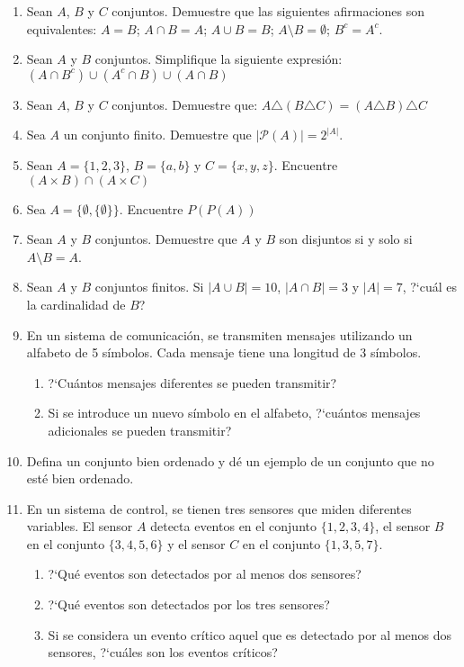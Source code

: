 \begin{enumerate}
	
	\item Sean $A$, $B$ y $C$ conjuntos. Demuestre que las siguientes afirmaciones son equivalentes: $A = B$; $A \cap B = A$; $A \cup B = B$; $A \setminus B = \emptyset$; $B^c = A^c$.
	
	\item Sean $A$ y $B$ conjuntos. Simplifique la siguiente expresión:
	\( (A \cap B^c) \cup (A^c \cap B) \cup (A \cap B) \)
	\item Sean $A$, $B$ y $C$ conjuntos. Demuestre que: \( A \triangle (B \triangle C) = (A \triangle B) \triangle C \)
	
	\item Sea $A$ un conjunto finito. Demuestre que $|\mathcal{P}(A)| = 2^{|A|}$.
	
	\item Sean $A=\{1,2,3\}$, $B=\{a,b\}$ y $C=\{x,y,z\}$. Encuentre $(A \times B) \cap (A \times C)$
	
	\item Sea $A=\{\emptyset, \{\emptyset\}\}$. Encuentre $P(P(A))$
	
	\item Sean $A$ y $B$ conjuntos. Demuestre que $A$ y $B$ son disjuntos si y solo si $A \setminus B=A$.
	
	\item Sean $A$ y $B$ conjuntos finitos. Si $|A \cup B|=10$, $|A \cap B|=3$ y $|A|=7$, ?`cuál es la cardinalidad de $B$?
	
	\item En un sistema de comunicación, se transmiten mensajes utilizando un alfabeto de 5 símbolos. Cada mensaje tiene una longitud de 3 símbolos.
	\begin{enumerate}[itemsep=-3pt]
		\item ?`Cuántos mensajes diferentes se pueden transmitir?
		\item Si se introduce un nuevo símbolo en el alfabeto, ?`cuántos mensajes adicionales se pueden transmitir?
	\end{enumerate}
	
	\item Defina un conjunto bien ordenado y dé un ejemplo de un conjunto que no esté bien ordenado.
	
	\item En un sistema de control, se tienen tres sensores que miden diferentes variables. El sensor $A$ detecta eventos en el conjunto $\{1,2,3,4\}$, el sensor $B$ en el conjunto $\{3,4,5,6\}$ y el sensor $C$ en el conjunto $\{1,3,5,7\}$.
	\begin{enumerate}[itemsep=-3pt]
		\item ?`Qué eventos son detectados por al menos dos sensores?
		\item ?`Qué eventos son detectados por los tres sensores?
		\item Si se considera un evento crítico aquel que es detectado por al menos dos sensores, ?`cuáles son los eventos críticos?
	\end{enumerate}


\end{enumerate}
